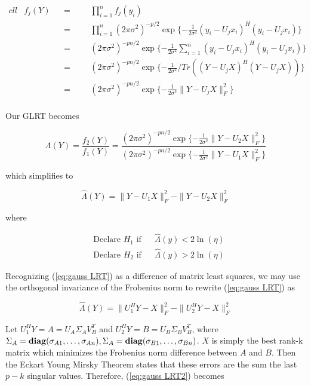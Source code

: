 \documentclass[english]{article}
\begin{document}
\begin{equation}
\begin{aligned}{cll}
&f_j(Y)
&&=
&&&\prod_{i=1}^nf_j(y_i)\\
&&&=
&&&\prod_{i=1}^n(2\pi\sigma^2)^{-p/2}\exp\{-\frac{1}{2\sigma^2}(y_i-U_jx_i)^H(y_i-U_jx_i)\}\\
&&&=
&&&(2\pi\sigma^2)^{-pn/2}\exp\{-\frac{1}{2\sigma^2}\sum_{i=1}^n(y_i-U_jx_i)^H(y_i-U_jx_i)\}\\
&&&=
&&&(2\pi\sigma^2)^{-pn/2}\exp\{-\frac{1}{2\sigma^2}/Tr((Y-U_jX)^H(Y-U_jX))\}\\
&&&=
&&&(2\pi\sigma^2)^{-pn/2}\exp\{-\frac{1}{2\sigma^2}\|Y-U_jX\|_F^2\}\\
\end{aligned}
\end{equation}

Our GLRT becomes

\begin{equation}
\Lambda(Y) = \frac{f_2(Y)}{f_1(Y)}=\frac{(2\pi\sigma^2)^{-pn/2}\exp\{-\frac{1}{2\sigma^2}\|Y-U_2X\|_F^2\}}{(2\pi\sigma^2)^{-pn/2}\exp\{-\frac{1}{2\sigma^2}\|Y-U_1X\|_F^2\}}
\end{equation}

which simplifies to

\begin{equation}\label{eq:gauss LRT}
\hat{\Lambda}(Y) = \|Y-U_1X\|_F^2-\|Y-U_2X\|_F^2
\end{equation}

where

\begin{equation}
\begin{aligned}
&\text{Declare } H_1 \text{ if}
&& \hat{\Lambda}(y) < 2\ln(\eta)\\
& \text{Declare } H_2 \text{ if}
&& \hat{\Lambda}(y) > 2\ln(\eta)
\end{aligned}
\end{equation}

Recognizing (\ref{eq:gauss LRT}) as a difference of matrix least squares, we may use the orthogonal invariance of the Frobenius norm to rewrite (\ref{eq:gauss LRT}) as

\begin{equation}\label{eq:gauss LRT2}
\hat{\Lambda}(Y) = \|U_1^HY-X\|_F^2-\|U_2^HY-X\|_F^2
\end{equation}

Let $U_1^HY=A=U_A\Sigma_AV_B^T$ and $U_2^HY=B=U_B\Sigma_BV_B^T$, where $\Sigma_A = \mathop{\bf diag}(\sigma_{A1},\dots,\sigma_{An}), \Sigma_A = \mathop{\bf diag}(\sigma_{B1},\dots,\sigma_{Bn})$. $X$ is simply the best rank-k matrix which minimizes the Frobenius norm difference between $A$ and $B$. Then the Eckart Young Mirsky Theorem states that these errors are the sum the last $p-k$ singular values. Therefore, (\ref{eq:gauss LRT2}) becomes
\end{document}
